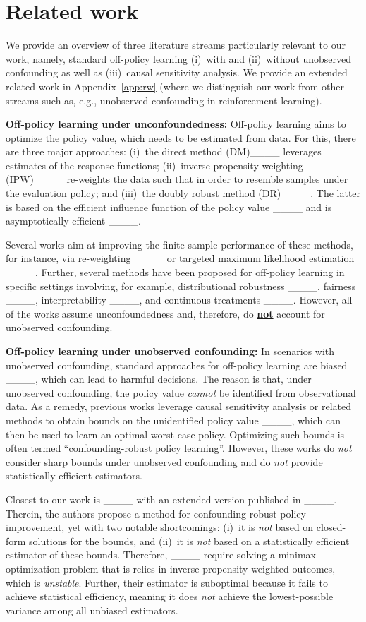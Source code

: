 \section{Related work}
\label{sec:rw}
We provide an overview of three literature streams particularly relevant to our work, namely, standard off-policy learning (i)~with and (ii)~without unobserved confounding as well as (iii)~causal sensitivity analysis. We provide an extended related work in Appendix~\ref{app:rw} (where we distinguish our work from other streams such as, e.g., unobserved confounding in reinforcement learning).

\textbf{Off-policy learning under unconfoundedness:} Off-policy learning aims to optimize the policy value, which needs to be estimated from data. For this, there are three major approaches: (i)~the direct method (DM)____ leverages estimates of the response functions; (ii)~inverse propensity weighting (IPW)____ re-weights the data such that in order to resemble samples under the evaluation policy; and (iii)~the doubly robust method (DR)____. The latter is based on the efficient influence function of the policy value ____ and is asymptotically efficient ____. 

Several works aim at improving the finite sample performance of these methods, for instance, via re-weighting ____ or targeted maximum likelihood estimation ____. Further, several methods have been proposed for off-policy learning in specific settings involving, for example, distributional robustness ____, fairness ____, interpretability ____, and continuous treatments ____. However, all of the works assume unconfoundedness and, therefore, do \textbf{\underline{not}} account for unobserved confounding.


\textbf{Off-policy learning under unobserved confounding:} In scenarios with unobserved confounding, standard approaches for off-policy learning are biased ____, which can lead to harmful decisions. The reason is that, under unobserved confounding, the policy value  \emph{cannot} be identified from observational data. As a remedy, previous works leverage causal sensitivity analysis or related methods to obtain bounds on the unidentified policy value ____, which can then be used to learn an optimal worst-case policy. Optimizing such bounds is often termed ``confounding-robust policy learning''. However, these works do \emph{not} consider sharp bounds under unobserved confounding and do \emph{not} provide statistically efficient estimators.

Closest to our work is ____ with an extended version published in ____. Therein, the authors propose a method for confounding-robust policy improvement, yet with two notable shortcomings: (i)~it is \emph{not} based on closed-form solutions for the bounds, and (ii)~it is \emph{not} based on a statistically efficient estimator of these bounds. Therefore, ____ require solving a minimax optimization problem that is relies in inverse propensity weighted outcomes, which is \emph{unstable}. Further, their estimator is suboptimal because it fails to achieve statistical efficiency, meaning it does \emph{not} achieve the lowest-possible variance among all unbiased estimators. 

